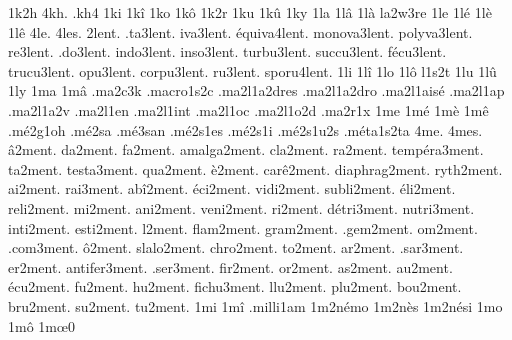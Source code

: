 {1k2h
4kh.
.kh4
1ki
1k\^i
1ko
1k\^o
1k2r
1ku
1k\^u
1ky
1la
1l\^a
1l\`a
                    la2w3re
1le
1l\'e
1l\`e
1l\^e
4le.
4les.
        2lent.
     .ta3lent.
     iva3lent.
\'equiva4lent.
  monova3lent.
  polyva3lent.
      re3lent.
     .do3lent.
    indo3lent.
    inso3lent.
   turbu3lent.
   succu3lent.
  f\'ecu3lent.
   trucu3lent.
     opu3lent.
   corpu3lent.
      ru3lent.
   sporu4lent.
%
1li
1l\^i
1lo
1l\^o
l1s2t
1lu
1l\^u
1ly
1ma
1m\^a
                    .ma2c3k
                    .macro1s2c
                    .ma2l1a2dres
                    .ma2l1a2dro
                    .ma2l1ais\'e
                    .ma2l1ap
                    .ma2l1a2v
                    .ma2l1en
                    .ma2l1int
                    .ma2l1oc
                    .ma2l1o2d
                    .ma2r1x %
1me
1m\'e
1m\`e
1m\^e
                    .m\'e2g1oh
                    .m\'e2sa %
                    .m\'e3san %
                    .m\'e2s1es
                    .m\'e2s1i
                    .m\'e2s1u2s
                    .m\'eta1s2ta
4me.
4mes.
      \^a2ment.
       da2ment.
       fa2ment.
   amalga2ment.
      cla2ment.
       ra2ment.
temp\'era3ment.
       ta2ment.
    testa3ment.
      qua2ment.
      \`e2ment.
   car\^e2ment.
 diaphrag2ment.
     ryth2ment.
       ai2ment.
      rai3ment.
   ab\^i2ment.
    \'eci2ment.
     vidi2ment.
    subli2ment.
    \'eli2ment.
     reli2ment.
       mi2ment.
      ani2ment.
     veni2ment.
       ri2ment.
  d\'etri3ment.
    nutri3ment.
     inti2ment.
     esti2ment.
        l2ment.
     flam2ment.
     gram2ment.
     .gem2ment.
       om2ment.
     .com3ment.
      \^o2ment.
    slalo2ment.
     chro2ment.
       to2ment.
       ar2ment.
     .sar3ment.
       er2ment.
  antifer3ment.
     .ser3ment.
      fir2ment.
       or2ment.
       as2ment.
       au2ment.
    \'ecu2ment.
       fu2ment.
       hu2ment.
    fichu3ment.
      llu2ment.
      plu2ment.
      bou2ment.
      bru2ment.
       su2ment.
       tu2ment.
%
1mi
1m\^i
                    .milli1am
                    1m2n\'emo
                    1m2n\`es
                    1m2n\'esi
1mo
1m\^o
1m\oe0 %
}

